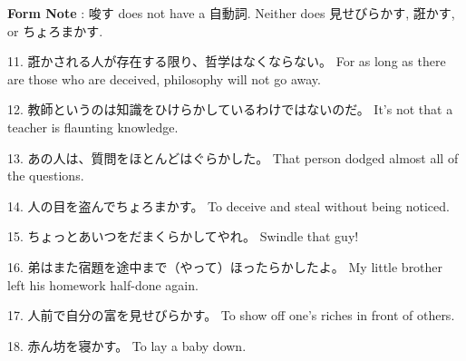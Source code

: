 \par{\textbf{Form Note }: 唆す does not have a 自動詞. Neither does 見せびらかす, 誑かす, or ちょろまかす. }

\par{11. 誑かされる人が存在する限り、哲学はなくならない。 \hfill\break
For as long as there are those who are deceived, philosophy will not go away. }

\par{12. 教師というのは知識をひけらかしているわけではないのだ。 \hfill\break
It's not that a teacher is flaunting knowledge. }

\par{13. あの人は、質問をほとんどはぐらかした。 \hfill\break
That person dodged almost all of the questions. }

\par{14. 人の目を盗んでちょろまかす。 \hfill\break
To deceive and steal without being noticed. }

\par{15. ちょっとあいつをだまくらかしてやれ。 \hfill\break
Swindle that guy! }

\par{16. 弟はまた宿題を途中まで（やって）ほったらかしたよ。 \hfill\break
My little brother left his homework half-done again. }

\par{17. 人前で自分の富を見せびらかす。 \hfill\break
To show off one's riches in front of others. }

\par{18. 赤ん坊を寝かす。 \hfill\break
To lay a baby down. }
    